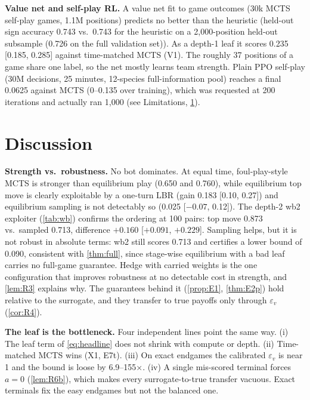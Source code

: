 \documentclass[10pt]{article}
\theoremstyle{plain}
\theoremstyle{definition}
\theoremstyle{remark}
\newcommand{\epsv}{\varepsilon_v}
\begin{document}
\textbf{Value net and self-play RL.} A value net fit to game outcomes (30k MCTS self-play games, 1.1M positions) predicts no better than the heuristic (held-out sign accuracy 0.743 vs.\ 0.743 for the heuristic on a 2,000-position held-out subsample (0.726 on the full validation set)). As a depth-1 leaf it scores 0.235 [0.185, 0.285] against time-matched MCTS (V1). The roughly 37 positions of a game share one label, so the net mostly learns team strength. Plain PPO self-play (30M decisions, 25 minutes, 12-species full-information pool) reaches a final 0.0625 against MCTS (0--0.135 over training), which was requested at 200 iterations and actually ran 1,000 (see Limitations, \cref{sec:discussion}).

\section{Discussion}
\label{sec:discussion}
\textbf{Strength vs.\ robustness.} No bot dominates. At equal time, foul-play-style MCTS is stronger than equilibrium play (0.650 and 0.760), while equilibrium top move is clearly exploitable by a one-turn LBR (gain 0.183 [0.10, 0.27]) and equilibrium sampling is not detectably so (0.025 [$-0.07$, 0.12]). The depth-2 wb2 exploiter (\cref{tab:wb}) confirms the ordering at 100 pairs: top move 0.873 vs.\ sampled 0.713, difference $+0.160$ [$+0.091$, $+0.229$]. Sampling helps, but it is not robust in absolute terms: wb2 still scores 0.713 and certifies a lower bound of 0.090, consistent with \cref{thm:full}, since stage-wise equilibrium with a bad leaf carries no full-game guarantee. Hedge with carried weights is the one configuration that improves robustness at no detectable cost in strength, and \cref{lem:R3} explains why. The guarantees behind it (\cref{prop:E1}, \cref{thm:E2p}) hold relative to the surrogate, and they transfer to true payoffs only through $\epsv$ (\cref{cor:R4}).

\textbf{The leaf is the bottleneck.} Four independent lines point the same way. (i) The leaf term of \eqref{eq:headline} does not shrink with compute or depth. (ii) Time-matched MCTS wins (X1, E7t). (iii) On exact endgames the calibrated $\epsv$ is near 1 and the bound is loose by 6.9--155$\times$. (iv) A single mis-scored terminal forces $a=0$ (\cref{lem:R6b}), which makes every surrogate-to-true transfer vacuous. Exact terminals fix the easy endgames but not the balanced one.
\end{document}
